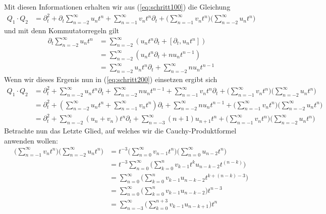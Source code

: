 Mit diesen Informationen erhalten wir aus (\ref{eq:schritt100}) die Gleichung
\begin{align} \label{eq:schritt200}
Q_1\cdot Q_2&=\partial_t^2 + \partial_t \sum_{n=-2}^\infty u_n t^n 
  + \sum_{n=-1}^\infty v_nt^n \partial_t 
  + \Big(\sum_{n=-1}^\infty v_nt^n \Big)\Big( \sum_{n=-2}^\infty u_n t^n \Big)
\end{align}
und mit denn Kommutatorregeln %
gilt
\begin{align*}
\partial_t \sum_{n=-2}^\infty u_n t^n &= 
  \sum_{n=-2}^\infty (u_nt^n\partial_t + [\partial_t,u_nt^n])
\\&= \sum_{n=-2}^\infty (u_nt^n\partial_t + nu_nt^{n-1})
\\&= \sum_{n=-2}^\infty u_nt^n\partial_t + \sum_{n=-2}^\infty nu_nt^{n-1}
\end{align*}
Wenn wir dieses Ergenis nun in (\ref{eq:schritt200}) einsetzen ergibt sich
\begin{equation} \label{eq:schritt300}
  \begin{aligned}
Q_1\cdot Q_2&=\partial_t^2 + \sum_{n=-2}^\infty u_nt^n\partial_t 
  + \sum_{n=-2}^\infty nu_nt^{n-1} + \sum_{n=-1}^\infty v_nt^n \partial_t 
  + \Big(\sum_{n=-1}^\infty v_nt^n \Big)\Big( \sum_{n=-2}^\infty u_n t^n \Big)
\\&=\partial_t^2 + (\sum_{n=-2}^\infty u_nt^n
  + \sum_{n=-1}^\infty v_nt^n) \partial_t 
  + \sum_{n=-2}^\infty nu_nt^{n-1} 
  + \Big(\sum_{n=-1}^\infty v_nt^n \Big)\Big( \sum_{n=-2}^\infty u_n t^n \Big)
\\&=\partial_t^2 + \sum_{n=-2}^\infty (u_n+v_n)t^n \partial_t 
  + \sum_{n=-3}^\infty (n+1)u_{n+1}t^{n} 
  + \Big(\sum_{n=-1}^\infty v_nt^n \Big)\Big( \sum_{n=-2}^\infty u_n t^n \Big)
  \end{aligned}
\end{equation}
Betrachte nun das Letzte Glied, auf welches wir die Cauchy-Produktformel
anwenden wollen: %
\begin{align*}
\Big(\sum_{n=-1}^\infty v_nt^n \Big)\Big( \sum_{n=-2}^\infty u_n t^n \Big)
  &= t^{-3}\Big(\sum_{n=0}^\infty v_{n-1}t^{n} \Big)
  \Big( \sum_{n=0}^\infty u_{n-2} t^{n} \Big)
\\&= t^{-3}\sum_{n=0}^\infty
  \Big( \sum_{k=0}^n v_{k-1}t^{k} u_{n-k-2} t^{(n-k)} \Big)
\\&= \sum_{n=0}^\infty \Big( \sum_{k=0}^n v_{k-1}u_{n-k-2}t^{k+(n-k)-3} \Big)
\\&= \sum_{n=0}^\infty \Big( \sum_{k=0}^n v_{k-1} u_{n-k-2} \Big) t^{n-3}
\\&= \sum_{n=-3}^\infty \Big( \sum_{k=0}^{n+3} v_{k-1} u_{n-k+1} \Big) t^{n}
\end{align*}
